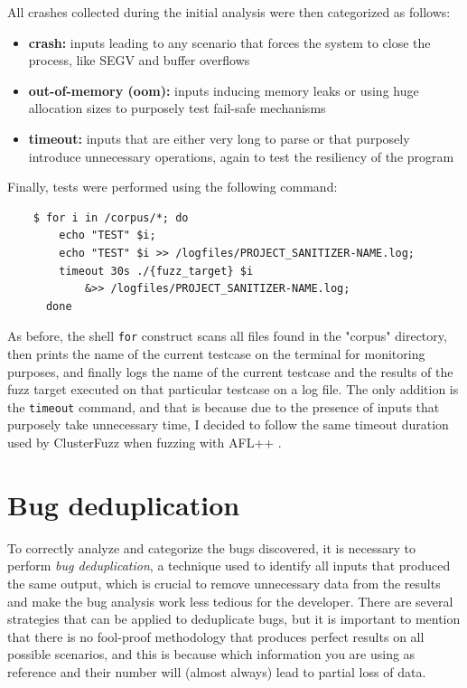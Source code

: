 \newpage
All crashes collected during the initial analysis were then categorized as follows:
\begin{itemize}
    \item \textbf{crash:} inputs leading to any scenario that forces the system to close the process, like SEGV and buffer overflows
    \item \textbf{out-of-memory (oom):} inputs inducing memory leaks or using huge allocation sizes to purposely test fail-safe mechanisms
    \item \textbf{timeout:} inputs that are either very long to parse or that purposely introduce unnecessary operations, again to test the resiliency of the program 
\end{itemize}

Finally, tests were performed using the following command:
\begin{verbatim}
    $ for i in /corpus/*; do 
        echo "TEST" $i; 
        echo "TEST" $i >> /logfiles/PROJECT_SANITIZER-NAME.log; 
        timeout 30s ./{fuzz_target} $i 
            &>> /logfiles/PROJECT_SANITIZER-NAME.log; 
      done
\end{verbatim}
As before, the shell \verb|for| construct scans all files found in the "corpus" directory, then prints the name of the current testcase on the terminal for monitoring purposes, and finally logs the name of the current testcase and the results of the fuzz target executed on that particular testcase on a log file. The only addition is the \verb|timeout| command, and that is because due to the presence of inputs that purposely take unnecessary time, I decided to follow the same timeout duration used by ClusterFuzz when fuzzing with AFL++ \cite{timeout}.





\newpage
\section{Bug deduplication} \label{bug_dedup}
To correctly analyze and categorize the bugs discovered, it is necessary to perform \textit{bug deduplication}, a technique used to identify all inputs that produced the same output, which is crucial to remove unnecessary data from the results and make the bug analysis work less tedious for the developer. There are several strategies that can be applied to deduplicate bugs, but it is important to mention that there is no fool-proof methodology that produces perfect results on all possible scenarios, and this is because which information you are using as reference and their number will (almost always) lead to partial loss of data.

